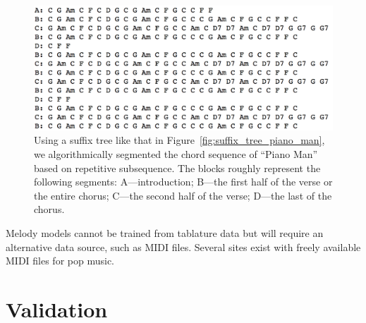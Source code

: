 \documentclass[11pt,phd]{byuprop}
\begin{document}
\begin{figure}
  \centering
  \includegraphics[width=.75\textwidth]{graphics/piano_man_chord_suffix_structure.png}
  \caption{Using a suffix tree like that in Figure~\ref{fig:suffix_tree_piano_man}, we algorithmically segmented the chord sequence of ``Piano Man'' based on repetitive subsequence. The blocks roughly represent the following segments: A---introduction; B---the first half of the verse or the entire chorus; C---the second half of the verse; D---the last of the chorus.}
    \label{fig:piano_man_chord_suffix_structure}
\end{figure}

Melody models cannot be trained from tablature data but will require an alternative data source, such as MIDI files. Several sites exist with freely available MIDI files for pop music.

%

\section{Validation}
%
\end{document}
